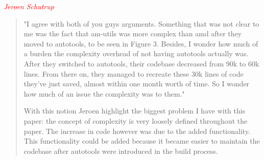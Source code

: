 \emph{\textcolor{red}{Jeroen Schutrup}}
\begin{quotation}
"I agree with both of you guys arguments. Something that was not clear to me was the fact that am-utils was more complex than amd after they moved to autotools, to be seen in Figure 3. Besides, I wonder how much of a burden the complexity overhead of not having autotools actually was. After they switched to autotools, their codebase decreased from 90k to 60k lines. From there on, they managed to recreate these 30k lines of code they've just saved, almost within one month worth of time. So I wonder how much of an issue the complexity was to them."

With this notion Jeroen highlight the biggest problem I have with this paper: the concept of complexity is very loosely defined throughout the paper. The increase in code however was due to the added functionality. This functionality could be added because it became easier to maintain the codebase after autotools were introduced in the build process. 
\end{quotation}

